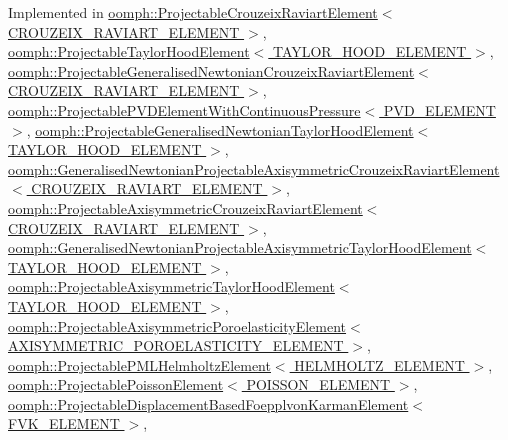 Implemented in \hyperlink{classoomph_1_1ProjectableCrouzeixRaviartElement_a90aa4875deb63383d5e4bf7b4a860a3c}{oomph\+::\+Projectable\+Crouzeix\+Raviart\+Element$<$ C\+R\+O\+U\+Z\+E\+I\+X\+\_\+\+R\+A\+V\+I\+A\+R\+T\+\_\+\+E\+L\+E\+M\+E\+N\+T $>$}, \hyperlink{classoomph_1_1ProjectableTaylorHoodElement_a86f40ce1d2f04cfe2a4b738cdc72a318}{oomph\+::\+Projectable\+Taylor\+Hood\+Element$<$ T\+A\+Y\+L\+O\+R\+\_\+\+H\+O\+O\+D\+\_\+\+E\+L\+E\+M\+E\+N\+T $>$}, \hyperlink{classoomph_1_1ProjectableGeneralisedNewtonianCrouzeixRaviartElement_a6c8b647ec31436a5f35e4eee2cd678b6}{oomph\+::\+Projectable\+Generalised\+Newtonian\+Crouzeix\+Raviart\+Element$<$ C\+R\+O\+U\+Z\+E\+I\+X\+\_\+\+R\+A\+V\+I\+A\+R\+T\+\_\+\+E\+L\+E\+M\+E\+N\+T $>$}, \hyperlink{classoomph_1_1ProjectablePVDElementWithContinuousPressure_a022141e748543a3d95230707d64f8baf}{oomph\+::\+Projectable\+P\+V\+D\+Element\+With\+Continuous\+Pressure$<$ P\+V\+D\+\_\+\+E\+L\+E\+M\+E\+N\+T $>$}, \hyperlink{classoomph_1_1ProjectableGeneralisedNewtonianTaylorHoodElement_a34bc56caf12c251a15509f1be90debf1}{oomph\+::\+Projectable\+Generalised\+Newtonian\+Taylor\+Hood\+Element$<$ T\+A\+Y\+L\+O\+R\+\_\+\+H\+O\+O\+D\+\_\+\+E\+L\+E\+M\+E\+N\+T $>$}, \hyperlink{classoomph_1_1GeneralisedNewtonianProjectableAxisymmetricCrouzeixRaviartElement_adb32f53c8b407273afcd7eb95a1dbb54}{oomph\+::\+Generalised\+Newtonian\+Projectable\+Axisymmetric\+Crouzeix\+Raviart\+Element$<$ C\+R\+O\+U\+Z\+E\+I\+X\+\_\+\+R\+A\+V\+I\+A\+R\+T\+\_\+\+E\+L\+E\+M\+E\+N\+T $>$}, \hyperlink{classoomph_1_1ProjectableAxisymmetricCrouzeixRaviartElement_a99ab07cbe191cc6d692e52d89bad0877}{oomph\+::\+Projectable\+Axisymmetric\+Crouzeix\+Raviart\+Element$<$ C\+R\+O\+U\+Z\+E\+I\+X\+\_\+\+R\+A\+V\+I\+A\+R\+T\+\_\+\+E\+L\+E\+M\+E\+N\+T $>$}, \hyperlink{classoomph_1_1GeneralisedNewtonianProjectableAxisymmetricTaylorHoodElement_a0fadb5b52ae5980e6826d75e6be982b3}{oomph\+::\+Generalised\+Newtonian\+Projectable\+Axisymmetric\+Taylor\+Hood\+Element$<$ T\+A\+Y\+L\+O\+R\+\_\+\+H\+O\+O\+D\+\_\+\+E\+L\+E\+M\+E\+N\+T $>$}, \hyperlink{classoomph_1_1ProjectableAxisymmetricTaylorHoodElement_a60842beb2f919f071623db9c1dc8a69a}{oomph\+::\+Projectable\+Axisymmetric\+Taylor\+Hood\+Element$<$ T\+A\+Y\+L\+O\+R\+\_\+\+H\+O\+O\+D\+\_\+\+E\+L\+E\+M\+E\+N\+T $>$}, \hyperlink{classoomph_1_1ProjectableAxisymmetricPoroelasticityElement_a593b32549e17dedf66365bf3fd202536}{oomph\+::\+Projectable\+Axisymmetric\+Poroelasticity\+Element$<$ A\+X\+I\+S\+Y\+M\+M\+E\+T\+R\+I\+C\+\_\+\+P\+O\+R\+O\+E\+L\+A\+S\+T\+I\+C\+I\+T\+Y\+\_\+\+E\+L\+E\+M\+E\+N\+T $>$}, \hyperlink{classoomph_1_1ProjectablePMLHelmholtzElement_ab90d84e474fccf3a814ea99ecd02e61c}{oomph\+::\+Projectable\+P\+M\+L\+Helmholtz\+Element$<$ H\+E\+L\+M\+H\+O\+L\+T\+Z\+\_\+\+E\+L\+E\+M\+E\+N\+T $>$}, \hyperlink{classoomph_1_1ProjectablePoissonElement_a0b8e911e3eca8dbfecd30a5e8dc2ff33}{oomph\+::\+Projectable\+Poisson\+Element$<$ P\+O\+I\+S\+S\+O\+N\+\_\+\+E\+L\+E\+M\+E\+N\+T $>$}, \hyperlink{classoomph_1_1ProjectableDisplacementBasedFoepplvonKarmanElement_a4146ddb00d3145268ccffc6a9742e1a5}{oomph\+::\+Projectable\+Displacement\+Based\+Foepplvon\+Karman\+Element$<$ F\+V\+K\+\_\+\+E\+L\+E\+M\+E\+N\+T $>$}, 